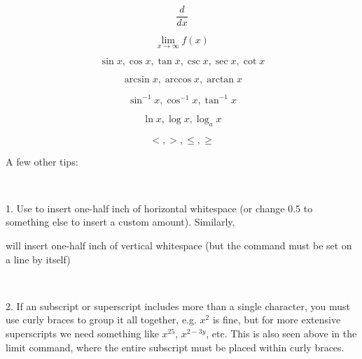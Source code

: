 \documentclass[10pt]{amsart}
\begin{document}
$$
\frac{d}{dx}  %
$$

$$
\lim_{x \rightarrow \infty} f(x)  %
$$

$$
\sin x, \cos x, \tan x, \csc x, \sec x, \cot x  %
$$

$$
\arcsin x, \arccos x, \arctan x  %
$$

$$
\sin^{-1} x, \cos^{-1} x, \tan^{-1} x  %
$$

$$
\ln x, \log x, \log_{a} x  %
$$

$$
<, >, \leq, \geq  %
$$


A few other tips:

\

1. Use \hspace{0.5in} to insert one-half inch of horizontal whitespace (or change 0.5 to something else to insert a custom amount).  Similarly, 

\vspace{0.5in} 

will insert one-half inch of vertical whitespace (but the command must be set on a line by itself)

\

2. If an subscript or superscript includes more than a single character, you must use curly braces to group it all together, e.g. $x^2$ is fine, but for more extensive superscripts we need something like $x^{25}$, $x^{2-3y}$, etc.  This is also seen above in the limit command, where the entire subscript must be placed within curly braces.
\end{document}
